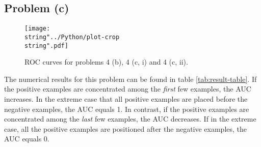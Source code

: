 \subsection*{Problem (c)}

\begin{figure}
\centering{}\texttt{[image: \\string"../Python/plot-crop\\string".pdf]}\caption{ROC curves for problems 4 (b), 4 (c, i) and 4 (c, ii).\label{fig:roc-curves} }
\end{figure}


The numerical results for this problem can be found in table \ref{tab:result-table}.
If the positive examples are concentrated among the \emph{first} few
examples, the AUC increases. In the extreme case that all positive
examples are placed before the negative examples, the AUC equals 1.
In contrast, if the positive examples are concentrated among the \emph{last}
few examples, the AUC decreases. If in the extreme case, all the positive
examples are positioned after the negative examples, the AUC equals
0.